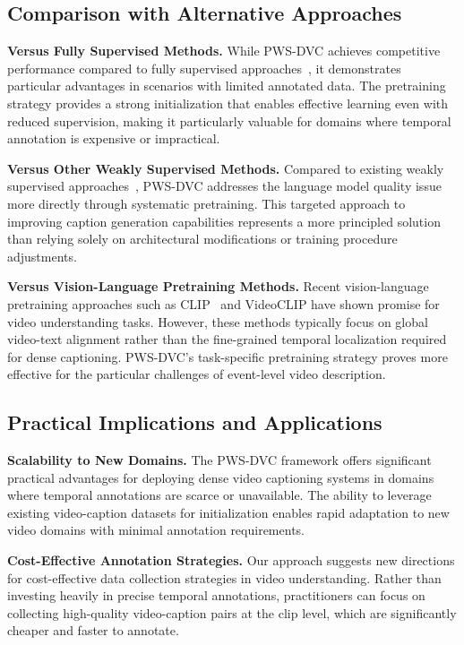 \subsection{Comparison with Alternative Approaches}

\textbf{Versus Fully Supervised Methods.}
While PWS-DVC achieves competitive performance compared to fully supervised approaches~\cite{Wang2021-zi,Zhou2018-zu}, it demonstrates particular advantages in scenarios with limited annotated data. The pretraining strategy provides a strong initialization that enables effective learning even with reduced supervision, making it particularly valuable for domains where temporal annotation is expensive or impractical.

\textbf{Versus Other Weakly Supervised Methods.}
Compared to existing weakly supervised approaches~\cite{Duan2018-qf}, PWS-DVC addresses the language model quality issue more directly through systematic pretraining. This targeted approach to improving caption generation capabilities represents a more principled solution than relying solely on architectural modifications or training procedure adjustments.

\textbf{Versus Vision-Language Pretraining Methods.}
Recent vision-language pretraining approaches such as CLIP~\cite{Radford2021-kx} and VideoCLIP have shown promise for video understanding tasks. However, these methods typically focus on global video-text alignment rather than the fine-grained temporal localization required for dense captioning. PWS-DVC's task-specific pretraining strategy proves more effective for the particular challenges of event-level video description.

\subsection{Practical Implications and Applications}

\textbf{Scalability to New Domains.}
The PWS-DVC framework offers significant practical advantages for deploying dense video captioning systems in domains where temporal annotations are scarce or unavailable. The ability to leverage existing video-caption datasets for initialization enables rapid adaptation to new video domains with minimal annotation requirements.

\textbf{Cost-Effective Annotation Strategies.}
Our approach suggests new directions for cost-effective data collection strategies in video understanding. Rather than investing heavily in precise temporal annotations, practitioners can focus on collecting high-quality video-caption pairs at the clip level, which are significantly cheaper and faster to annotate.

